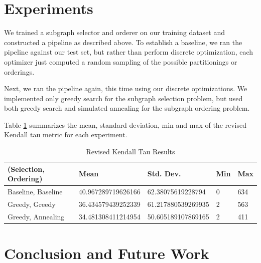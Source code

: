 \documentclass[12pt]{article}
\begin{document}
\section{Experiments}

We trained a subgraph selector and orderer on our training dataset and
constructed a pipeline as described above. To establish a baseline, we ran the
pipeline against our test set, but rather than perform discrete optimization,
each optimizer just computed a random sampling of the possible partitionings or
orderings.

Next, we ran the pipeline again, this time using our discrete optimizations.
We implemented only greedy search for the subgraph selection problem, but used
both greedy search and simulated annealing for the subgraph ordering problem.

Table \ref{tab:experiments} summarizes the mean, standard deviation, min and max of the
revised Kendall tau metric for each experiment.

\begin{table}[H]
\centering
\caption{Revised Kendall Tau Results}
\label{tab:experiments}
\begin{tabular}{@{}lllll@{}}
\toprule
\textbf{(Selection, Ordering)} & \textbf{Mean} & \textbf{Std. Dev.} & \textbf{Min} & \textbf{Max} \\ \midrule
Baseline, Baseline & 40.967289719626166 & 62.38075619228794 & 0 & 634 \\
Greedy, Greedy & 36.434579439252339 & 61.217880539269935 & 2 & 563 \\
Greedy, Annealing & 34.481308411214954 & 50.605189107869165 & 2 & 411 \\ \bottomrule
\end{tabular}
\end{table}

\section{Conclusion and Future Work}

\pagebreak


\end{document}
